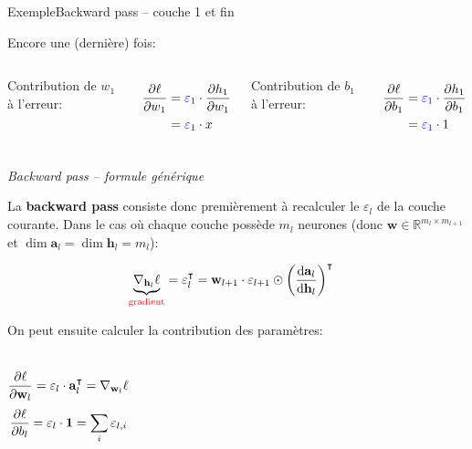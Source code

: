 \documentclass[12pt,dvipsnames,aspectratio=169]{beamer}
\newcommand{\w}[0]{\mathbf{w}}
\begin{document}
\begin{frame}{Exemple}{Backward pass -- couche 1 et fin}

    Encore une (dernière) fois:

    \vspace{1em}

    \begin{columns}
        Contribution de $w_1$ à l'erreur:

        \begin{align*}
            \pdv{\ell}{w_1} &= {\color{blue} \varepsilon_1} \cdot \pdv{h_1}{w_1} \\
            &= {\color{blue} \varepsilon_1} \cdot x
        \end{align*}

        Contribution de $b_1$ à l'erreur:

        \begin{align*}
            \pdv{\ell}{b_1} &= {\color{blue} \varepsilon_1} \cdot \pdv{h_1}{b_1} \\
            &= {\color{blue} \varepsilon_1} \cdot 1
        \end{align*}
        
    \end{columns}
    
\end{frame}

\begin{frame}{\textit{Backward pass -- formule générique}}

La \textbf{backward pass} consiste donc premièrement à recalculer le $\varepsilon_l$ de la couche courante. Dans le cas où chaque couche possède $m_l$ neurones (donc $\w \in \mathbb{R}^{m_{l} \times m_{l+1}}$ et $\dim \mathbf{a}_l = \dim \mathbf{h}_l = m_{l}$):

\begin{align*}
    \underbrace{\nabla_{\mathbf{h}_l}\ell}_{\color{red}\text{gradient}} = \varepsilon_{l}^\intercal &= \mathbf{w}_{l+1} \cdot \varepsilon_{l+1} \odot \left(\odv{\mathbf{a}_{l}}{\mathbf{h}_{l}}\right)^\intercal
\end{align*}

On peut ensuite calculer la contribution des paramètres:

\begin{columns}
    \begin{align*}
    \pdv{\ell}{\w_l} &= \varepsilon_l \cdot \mathbf{a}_l^\intercal = \nabla_{\mathbf{w}_l}\ell
\end{align*}
\begin{align*}
    \pdv{\ell}{b_l} &= \varepsilon_l \cdot \mathbf{1} = \sum_i \varepsilon_{l,i}
\end{align*}
\end{columns}

\end{frame}
\end{document}
